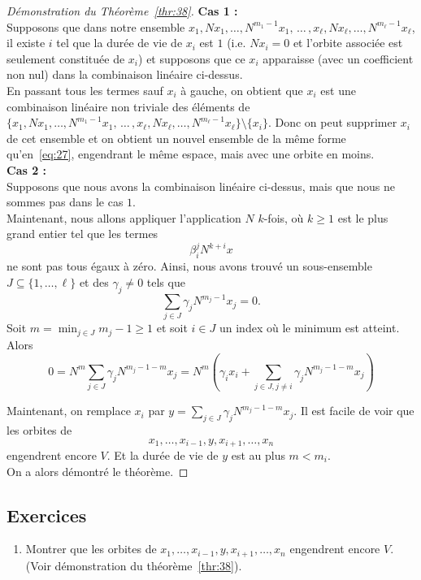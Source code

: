 \begin{proof}[Démonstration du Théorème~\ref{thr:38}]
\textbf{Cas 1 :} \\
Supposons que dans notre ensemble $x_1,Nx_1,\dots,N^{m_1-1}x_1, \,\dots \, ,  x_\ell,Nx_\ell,\dots,N^{m_\ell-1}x_\ell$, il existe $i$ tel que la durée de vie de $x_i$ est $1$ (i.e. $Nx_i = 0$ et l'orbite associée est seulement constituée de $x_i$) et supposons que ce $x_i$ apparaisse (avec un coefficient non nul) dans la combinaison linéaire ci-dessus. \\
En passant tous les termes sauf $x_i$ à gauche, on obtient  que $x_i$ est une combinaison linéaire non triviale des éléments de $\{ x_1,Nx_1,\dots,N^{m_1-1}x_1, \,\dots \, ,  x_\ell,Nx_\ell,\dots,N^{m_\ell-1}x_\ell \} \setminus \{x_i\}$. Donc on peut supprimer $x_i$ de cet ensemble et on obtient un nouvel ensemble de la même forme qu'en~\eqref{eq:27}, engendrant le même espace, mais avec une orbite en moins. \\

\textbf{Cas 2 :} \\
Supposons que nous avons la combinaison linéaire ci-dessus, mais que nous ne sommes pas dans le cas $1$. \\
Maintenant, nous allons appliquer l'application $N$ $k$-fois, où $k \geq 1$ est le plus grand entier tel que les termes 
\begin{displaymath}
  β_i^j N^{k+i}x 
\end{displaymath}
ne sont pas tous égaux à zéro. Ainsi, nous avons trouvé un sous-ensemble $J ⊆ \{1,\dots,\ell \}$ et des $γ_j ≠ 0$ tels que 
\begin{displaymath}
  \sum_{j \in J} γ_j N^{m_j-1}x_j = 0.
\end{displaymath}
Soit $m = \min_{j \in J} {m_j-1} \geq 1$ et soit $i \in J$ un index où le minimum est atteint. Alors 
\begin{displaymath}
 0 =  N^m  \sum_{j \in J} γ_j N^{m_j-1 - m}x_j  = N^m \left( γ_i x_i + \sum_{j \in J, j \neq i} γ_j N^{m_j-1 - m}x_j \right)
\end{displaymath}

Maintenant, on remplace $x_i$ par $y = \sum_{j \in J} γ_j N^{m_j-1 - m}x_j$. Il est facile de voir que les orbites de 
\begin{displaymath}
  x_1,\dots, x_{i-1},y,x_{i+1},\dots,x_n
\end{displaymath}
engendrent encore $V$. Et la durée de vie de $y$ est au plus $m<m_i$. \\
On a alors démontré le théorème.  
\end{proof}



\subsection*{Exercices} 

\begin{enumerate}
\item Montrer que les orbites de 
$ x_1,\dots, x_{i-1},y,x_{i+1},\dots,x_n $ engendrent encore $V$. (Voir démonstration du théorème~\ref{thr:38}).  
\end{enumerate}
